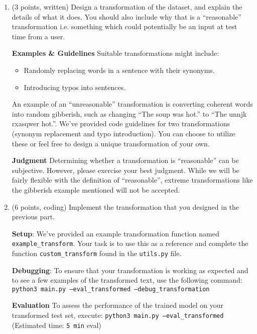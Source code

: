\documentclass{article}
\theoremstyle{case}
\theoremstyle{definition}
\begin{document}
\begin{enumerate}
    \item (3 points, written) Design a transformation of the dataset, and explain the details of what it does. You should also include why that is a ``reasonable'' transformation i.e. something which could potentially be an input at test time from a user.

    \textbf{Examples \& Guidelines} Suitable transformations might include:
    \begin{itemize}
        \item Randomly replacing words in a sentence with their synonyms.
        \item Introducing typos into sentences.
    \end{itemize}

   An example of an ``unreasonable'' transformation is converting coherent words into random gibberish, such as changing ``The soup was hot.'' to ``The unnjk rxasqwer hot.''. We've provided code guidelines for two transformations (synonym replacement and typo introduction). You can choose to utilize these or feel free to design a unique transformation of your own.

   \textbf{Judgment} Determining whether a transformation is ``reasonable'' can be subjective. However, please exercise your best judgment. While we will be fairly flexible with the definition of ``reasonable'', extreme transformations like the gibberish example mentioned will not be accepted.



    \newpage
    \item (6 points, coding) Implement the transformation that you designed in the previous part.

    \textbf{Setup}:  We've provided an example transformation function named \texttt{example\_transform}. Your task is to use this as a reference and complete the function \texttt{custom\_transform} found in the \texttt{utils.py} file.

    \textbf{Debugging}: To ensure that your transformation is working as expected and to see a few examples of the transformed text, use the following command: \texttt{python3 main.py --eval\_transformed --debug\_transformation}

    \textbf{Evaluation}  To assess the performance of the trained model on your transformed test set, execute: \texttt{python3 main.py --eval\_transformed} (Estimated time: \texttt{5 min} eval)


\end{enumerate}
\end{document}
